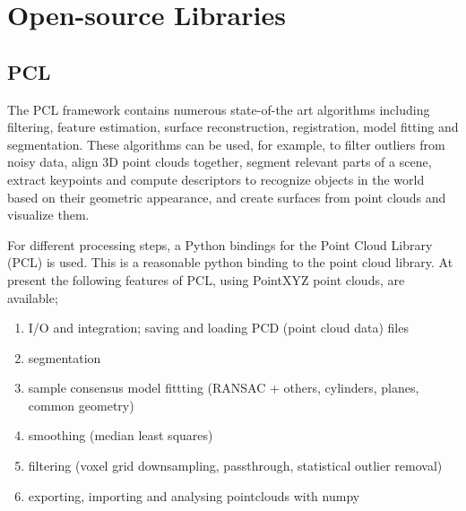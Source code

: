 \section{Open-source Libraries}
\subsection{PCL}

The PCL\cite{pcl} framework contains numerous state-of-the art algorithms including filtering, feature estimation, surface reconstruction, registration, model fitting and segmentation. These algorithms can be used, for example, to filter outliers from noisy data, align 3D point clouds together, segment relevant parts of a scene, extract keypoints and compute descriptors to recognize objects in the world based on their geometric appearance, and create surfaces from point clouds and visualize them. 

For different processing steps, a Python bindings for the Point Cloud Library (PCL) is used. This is a reasonable python binding to the point cloud library. At present the following features of PCL, using PointXYZ point clouds, are available;

\begin{enumerate}
    \item I/O and integration; saving and loading PCD (point cloud data) files
    \item segmentation
    \item sample consensus model fittting (RANSAC + others, cylinders, planes, common geometry)
    \item smoothing (median least squares)
    \item filtering (voxel grid downsampling, passthrough, statistical outlier removal)
    \item exporting, importing and analysing pointclouds with numpy
\end{enumerate}

